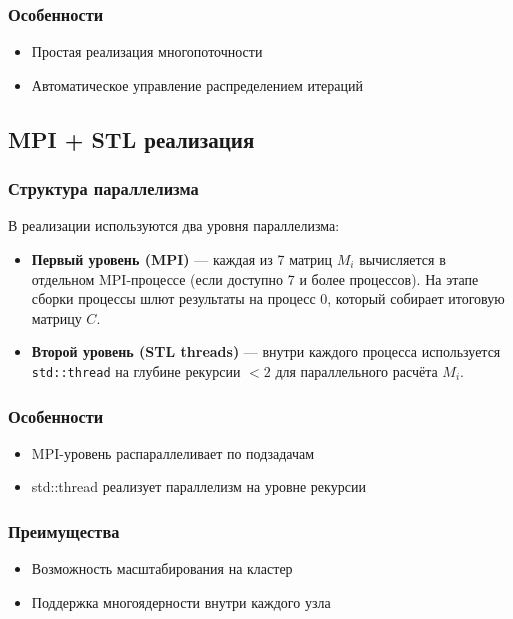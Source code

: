 \documentclass[12pt]{article}
\begin{document}
\subsubsection*{Особенности}
\begin{itemize}
  \item Простая реализация многопоточности
  \item Автоматическое управление распределением итераций
\end{itemize}

\subsection{MPI + STL реализация}
\subsubsection*{Структура параллелизма}
В реализации используются два уровня параллелизма:
\begin{itemize}
  \item \textbf{Первый уровень (MPI)} — каждая из 7 матриц $M_i$ вычисляется в отдельном MPI-процессе (если доступно 7 и более процессов). На этапе сборки процессы шлют результаты на процесс 0, который собирает итоговую матрицу $C$.
  \item \textbf{Второй уровень (STL threads)} — внутри каждого процесса используется \texttt{std::thread} на глубине рекурсии $< 2$ для параллельного расчёта $M_i$.
\end{itemize}

\subsubsection*{Особенности}
\begin{itemize}
  \item MPI-уровень распараллеливает по подзадачам
  \item std::thread реализует параллелизм на уровне рекурсии
\end{itemize}

\subsubsection*{Преимущества}
\begin{itemize}
  \item Возможность масштабирования на кластер
  \item Поддержка многоядерности внутри каждого узла
\end{itemize}
\end{document}
